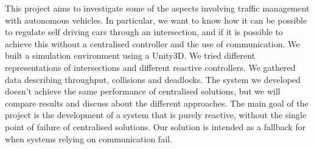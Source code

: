 \begin{em}
This project aims to investigate some of the aspects involving traffic management with autonomous vehicles.
In particular, we want to know how it can be possible to regulate self driving cars through an intersection, and if it is possible to achieve this without a centralised controller and the use of communication.
We built a simulation environment using a Unity3D. We tried different representations of intersections and different reactive controllers.
We gathered data describing throughput, collisions and deadlocks.
The system we developed doesn't achieve the same performance of centralised solutions, 
but we will compare results and discuss about the different approaches.
The main goal of the project is the development of a system that is purely reactive, without the single point of failure of centralised solutions.
Our solution is intended as a fallback for when systems relying on communication fail.
\end{em}